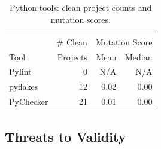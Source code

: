 \begin{table}
  \begin{tabular}{l|r|r|r}
    & & \multicolumn{2}{|c|}{} \\
    & \# Clean & \multicolumn{2}{|c|}{Mutation Score} \\
    Tool & Projects & Mean & Median \\
    \hline
    \hline
    Pylint & 0 & N/A & N/A \\
    \hline
    pyflakes & 12 & 0.02 & 0.00 \\
    \hline
    PyChecker & 21& 0.01 & 0.00 \\
    \hline
  \end{tabular}
  \caption{Python tools: clean project counts and mutation scores.}
  \label{tab:cleanpython}
\end{table}

\subsection{Threats to Validity}